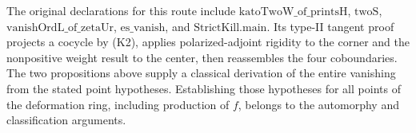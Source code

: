 The original declarations for this route include
\(\mathrm{katoTwoW\_of\_printsH}\), \(\mathrm{twoS}\),
\(\mathrm{vanishOrdL\_of\_zetaUr}\), \(\mathrm{es\_vanish}\),
and \(\mathrm{StrictKill.main}\). Its type-II tangent proof projects
a cocycle by (K2), applies polarized-adjoint rigidity to the corner
and the nonpositive weight result to the center, then reassembles
the four coboundaries. The two propositions above supply a
classical derivation of the entire vanishing from the stated point
hypotheses. Establishing those hypotheses for all points of the
deformation ring, including production of \(f\), belongs to the
automorphy and classification arguments.
